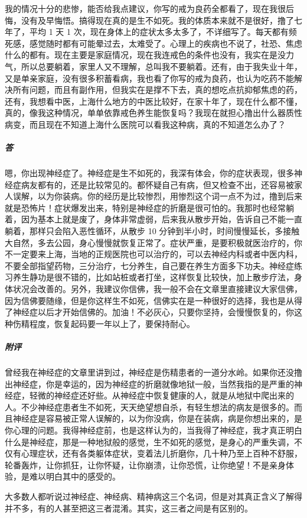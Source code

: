 \begin{case}
    我的情况十分的悲惨，能否给我点建议，你写的戒为良药全都看了，现在我很后悔，没有及早悔悟。搞得现在真的是生不如死。我的体质本来就不是很好，撸了七年了，平均 1 天 1 次，现在身体上的症状太多太多了，不详细写了。每天都有频死感，感觉随时都有可能晕过去，太难受了。心理上的疾病也不说了，社恐、焦虑什么的都有。现在主要是家庭情况，现在我连戒色的条件也没有，我实在是没力气，所以总要躺着，家里人又不理解，总叫我不要躺着。还有，由于我失业十年，又是单亲家庭，没有很多积蓄看病，我也看了你写的戒为良药，也认为吃药不能解决所有问题，而且有副作用，但我实在是撑不下去，真的想吃点抗抑郁焦虑的药，还有，我想看中医，上海什么地方的中医比较好，在家十年了，现在什么都不懂，真的，像我这种情况，单单依靠戒色养生能恢复吗？我现在就担心撸出什么器质性病变，而且现在不知道上海什么医院可以看我这种病，真的不知道怎么办了？
    \subparagraph{答} 嗯，你出现神经症了。神经症是生不如死的，我深有体会，你的症状表现，很多神经症病友都有的，还是比较常见的。都怀疑自己有病，但又检查不出，还容易被家人误解，以为你装病。你的经历是比较惨烈，用惨烈这个词一点不为过，撸到后来就是恐怖片！症状爆发出来，特别是神经症的折磨是很可怕的。我那时也经常躺着，因为基本上就是废了，身体非常虚弱，后来我从散步开始，告诉自己不能一直躺着，那样只会陷入恶性循环，从散步 10 分钟到半小时，时间慢慢延长，多接触大自然，多去公园，身心慢慢就恢复正常了。症状严重，是要积极就医治疗的，你不一定要来上海，当地的正规医院也可以治疗的，可以去神经内科或者中医内科，不要全部指望药物，三分治疗，七分养生，自己要在养生方面多下功夫。神经症练习养生静功是很不错的，比如站桩或者打坐，这样恢复比较快，加上散步疗法，身体状况会改善的。另外，我建议你信佛，我一般不会在文章里直接建议大家信佛，因为信佛要随缘，但是你这样生不如死，信佛实在是一种很好的选择，我也是从得了神经症以后才开始信佛的。加油！不必灰心，只要你坚持，会慢慢恢复的，你这种伤精程度，恢复起码要一年以上了，要保持耐心。
    \subparagraph{附评} 曾经我在神经症的文章里讲到过，神经症是伤精患者的一道分水岭。如果你还没撸出神经症，你是幸运的，因为神经症的折磨就像地狱一般，当然我指的是严重的神经症，轻微的神经症还好些。从神经症中恢复健康的人，就是从地狱中爬出来的人。不少神经症患者生不如死，天天绝望想自杀，有轻生想法的病友是很多的。而且神经症是容易被正常人误解的，以为你没病，你是在装病，病是你想出来的，是你心理的问题。我得神经症前，也是这样认为的，当我得了神经症，我才真正明白什么是神经症，那是一种地狱般的感觉，生不如死的感觉，是身心的严重失调，不仅有心理症状，还有各类躯体症状，变着法儿折磨你，几十种乃至上百种不舒服，轮番轰炸，让你抓狂，让你怀疑，让你崩溃，让你恐慌，让你绝望！不是亲身体验，是难以明白其中的感受的。

    大多数人都听说过神经症、神经病、精神病这三个名词，但是对其真正含义了解得并不多，有的人甚至把这三者混淆。其实，这三者之间是有区别的。


\end{case}

